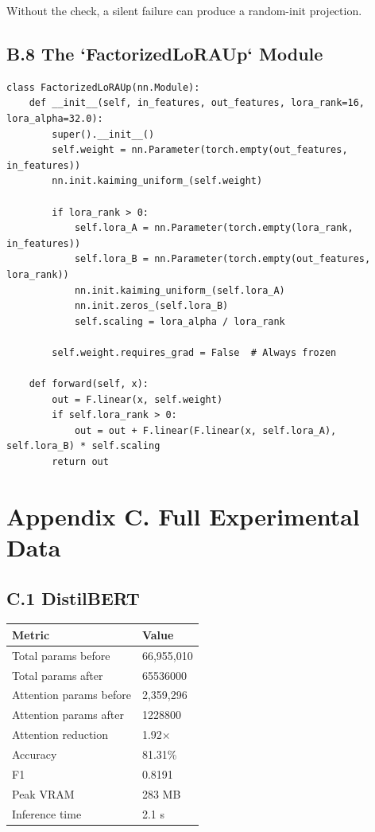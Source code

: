 Without the check, a silent failure can produce a random-init projection.

\subsection{B.8 The `FactorizedLoRAUp` Module}

\begin{lstlisting}
class FactorizedLoRAUp(nn.Module):
    def __init__(self, in_features, out_features, lora_rank=16, lora_alpha=32.0):
        super().__init__()
        self.weight = nn.Parameter(torch.empty(out_features, in_features))
        nn.init.kaiming_uniform_(self.weight)
        
        if lora_rank > 0:
            self.lora_A = nn.Parameter(torch.empty(lora_rank, in_features))
            self.lora_B = nn.Parameter(torch.empty(out_features, lora_rank))
            nn.init.kaiming_uniform_(self.lora_A)
            nn.init.zeros_(self.lora_B)
            self.scaling = lora_alpha / lora_rank
        
        self.weight.requires_grad = False  # Always frozen
    
    def forward(self, x):
        out = F.linear(x, self.weight)
        if self.lora_rank > 0:
            out = out + F.linear(F.linear(x, self.lora_A), self.lora_B) * self.scaling
        return out
\end{lstlisting}



\section{Appendix C. Full Experimental Data}

\subsection{C.1 DistilBERT}

\begin{table}[H]
\centering
\small
\begin{tabular}{ll}
\toprule
\textbf{Metric} & \textbf{Value} \\
\midrule
Total params before & 66,955,010 \\
Total params after & 65536000 \\
Attention params before & 2,359,296 \\
Attention params after & 1228800 \\
Attention reduction & 1.92$\times$ \\
Accuracy & 81.31\% \\
F1 & 0.8191 \\
Peak VRAM & 283 MB \\
Inference time & 2.1 s \\
\bottomrule
\end{tabular}
\end{table}

